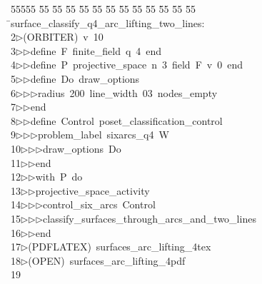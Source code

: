 %
%
\begin{tabbing}
55555 \= 55 \= 55 \= 55 \= 55 \= 55 \= 55 \= 55 \= 55 \= 55 \= 55 \= 55 \= 55 \= \>surface\_classify\_q4\_arc\_lifting\_two\_lines:\\[0pt]
2\>$\triangleright$\>(ORBITER)\ v\ 10\ \\[0pt]
3\>$\triangleright$\>$\triangleright$\>define\ F\ finite\_field\ q\ 4\ end\ \\[0pt]
4\>$\triangleright$\>$\triangleright$\>define\ P\ projective\_space\ n\ 3\ field\ F\ v\ 0\ end\ \\[0pt]
5\>$\triangleright$\>$\triangleright$\>define\ Do\ draw\_options\ \\[0pt]
6\>$\triangleright$\>$\triangleright$\>$\triangleright$\>radius\ 200\ line\_width\ 03\ nodes\_empty\ \\[0pt]
7\>$\triangleright$\>$\triangleright$\>end\ \\[0pt]
8\>$\triangleright$\>$\triangleright$\>define\ Control\ poset\_classification\_control\ \\[0pt]
9\>$\triangleright$\>$\triangleright$\>$\triangleright$\>problem\_label\ sixarcs\_q4\ W\ \\[0pt]
10\>$\triangleright$\>$\triangleright$\>$\triangleright$\>draw\_options\ Do\ \\[0pt]
11\>$\triangleright$\>$\triangleright$\>end\ \\[0pt]
12\>$\triangleright$\>$\triangleright$\>with\ P\ do\ \\[0pt]
13\>$\triangleright$\>$\triangleright$\>projective\_space\_activity\ \\[0pt]
14\>$\triangleright$\>$\triangleright$\>$\triangleright$\>control\_six\_arcs\ Control\ \\[0pt]
15\>$\triangleright$\>$\triangleright$\>$\triangleright$\>classify\_surfaces\_through\_arcs\_and\_two\_lines\ \\[0pt]
16\>$\triangleright$\>$\triangleright$\>end\\[0pt]
17\>$\triangleright$\>(PDFLATEX)\ surfaces\_arc\_lifting\_4tex\\[0pt]
18\>$\triangleright$\>(OPEN)\ surfaces\_arc\_lifting\_4pdf\\[0pt]
19\>\end{tabbing}
